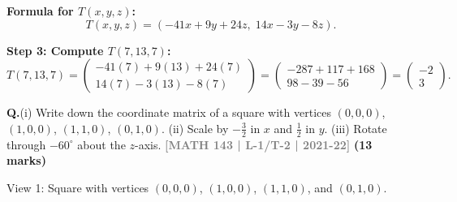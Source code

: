 \documentclass[12pt,a3paper]{article}
\newcommand{\yr}[1]{\hfill\textcolor{gray}{\small\textbf{[#1]}}}
\newcommand{\mk}[1]{\textcolor{orange!70!black}{\small\textbf{(#1 marks)}}}
\newcounter{qnum}
\newcommand{\Q}[1]{%
  \needspace{4\baselineskip}
  \refstepcounter{qnum}
  \vspace{6pt}
  \noindent\textbf{Q\theqnum.}\enspace #1\par
}
\begin{document}
\begin{tcolorbox}
\textbf{Formula for $T(x,y,z)$:}
\[
T(x,y,z)=(-41x+9y+24z,\;14x-3y-8z).
\]

\textbf{Step 3: Compute $T(7,13,7)$:}
\[
T(7,13,7)=\begin{pmatrix}-41(7)+9(13)+24(7)\\14(7)-3(13)-8(7)\end{pmatrix}=\begin{pmatrix}-287+117+168\\98-39-56\end{pmatrix}=\boxed{\begin{pmatrix}-2\\3\end{pmatrix}}.
\]

\end{tcolorbox}

\Q{(i) Write down the coordinate matrix of a square with vertices $(0,0,0)$, $(1,0,0)$, $(1,1,0)$, $(0,1,0)$. (ii) Scale by $-\frac{3}{2}$ in $x$ and $\frac{1}{2}$ in $y$. (iii) Rotate through $-60^\circ$ about the $z$-axis.
\yr{MATH 143 | L-1/T-2 | 2021-22} \mk{13}}

\begin{center}
    
    \vspace{0.4cm}
    \flushleft
    View 1: Square with vertices $(0, 0, 0)$, $(1, 0, 0)$, $(1, 1, 0)$, and $(0, 1, 0)$.
  \end{center}
\end{document}
